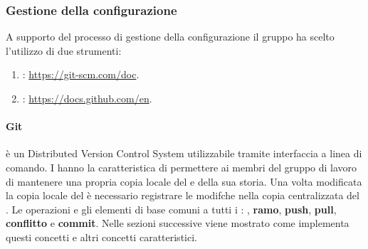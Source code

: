 \subsubsection{Gestione della configurazione}
A supporto del processo di gestione della configurazione il gruppo ha scelto l'utilizzo di due strumenti:
\begin{enumerate}
    \item {}: \href{https://git-scm.com/doc}{https://git-scm.com/doc}.
    \item {}: \href{https://docs.github.com/en}{https://docs.github.com/en}.
\end{enumerate}

\paragraph{Git}
 è un Distributed Version Control System   utilizzabile tramite interfaccia a linea di comando.
I  hanno la caratteristica di permettere ai membri del gruppo di lavoro di mantenere una propria copia locale del  e della sua storia.
Una volta modificata la copia locale del  è necessario registrare le modifche nella copia centralizzata del .
Le operazioni e gli elementi di base comuni a tutti i : \textbf{}, \textbf{ramo}, \textbf{push}, \textbf{pull}, \textbf{conflitto} e \textbf{commit}.
Nelle sezioni successive viene mostrato come  implementa questi concetti e altri concetti caratteristici.

